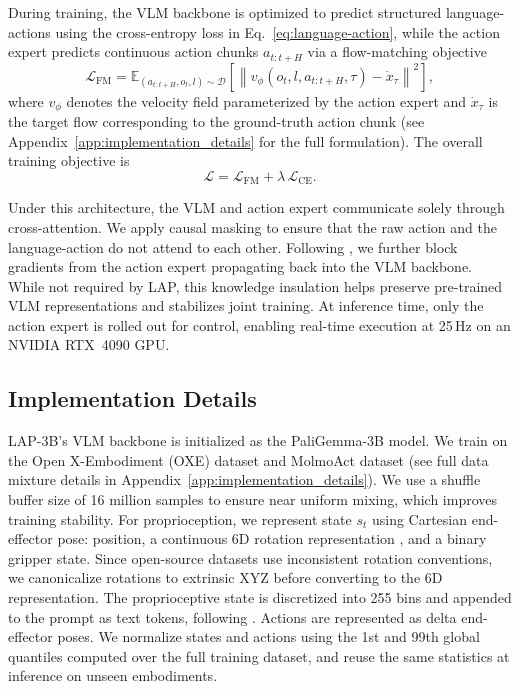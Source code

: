 During training, the VLM backbone is optimized to predict structured language-actions using the cross-entropy loss in Eq.~\eqref{eq:language-action}, while the action expert predicts continuous action chunks $a_{t:t+H}$ via a flow-matching objective
\begin{equation}
\mathcal{L}_{\text{FM}}
=
\mathbb{E}_{(a_{t:t+H}, o_t, l) \sim \mathcal{D}}
\left[
\left\|
v_{\phi}(o_t, l, a_{t:t+H}, \tau) - \dot{x}_{\tau}
\right\|^2
\right],
\end{equation}
where $v_{\phi}$ denotes the velocity field parameterized by the action expert and $\dot{x}_{\tau}$ is the target flow corresponding to the ground-truth action chunk (see Appendix~\ref{app:implementation_details} for the full formulation). The overall training objective is
\begin{equation}
\mathcal{L}
=
\mathcal{L}_{\text{FM}}
+
\lambda\,\mathcal{L}_{\text{CE}}.
\end{equation}

Under this architecture, the VLM and action expert communicate solely through cross-attention. We apply causal masking to ensure that the raw action and the language-action do not attend to each other.
Following \cite{driess2025knowledgeinsulatingvisionlanguageactionmodels}, we further block gradients from the action expert propagating back into the VLM backbone. While not required by LAP, this knowledge insulation helps preserve pre-trained VLM representations and stabilizes joint training. At inference time, only the action expert is rolled out for control, enabling real-time execution at 25\,Hz on an NVIDIA RTX~4090 GPU.



\subsection{Implementation Details}
\label{sec:implementation_details}


\textsc{LAP-3B}'s VLM backbone is initialized as the PaliGemma-3B \cite{beyer2024paligemmaversatile3bvlm} model. We train on the Open X-Embodiment (OXE) dataset \cite{embodimentcollaboration2025openxembodimentroboticlearning} and MolmoAct dataset \cite{lee2025molmoactactionreasoningmodels} (see full data mixture details in Appendix~\ref{app:implementation_details}). We use a shuffle buffer size of 16 million samples to ensure near uniform mixing, which improves training stability.
For proprioception, we represent state $s_t$ using Cartesian end-effector pose: position, a continuous 6D rotation representation \cite{zhou2019continuity}, and a binary gripper state. Since open-source datasets use inconsistent rotation conventions, we canonicalize rotations to extrinsic XYZ before converting to the 6D representation. The proprioceptive state is discretized into 255 bins and appended to the prompt as text tokens, following \cite{intelligence2025pi05visionlanguageactionmodelopenworld}. Actions are represented as delta end-effector poses. We normalize states and actions using the 1st and 99th global quantiles computed over the full training dataset, and reuse the same statistics at inference on unseen embodiments.

